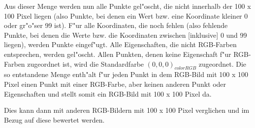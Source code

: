 Aus dieser Menge werden nun alle Punkte gel"oscht, die nicht innerhalb der 100 x 100 Pixel liegen (also Punkte, bei denen ein Wert bzw. eine Koordinate kleiner 0 oder gr"o"ser 99 ist). F"ur alle Koordinaten, die noch fehlen (also fehlende Punkte, bei denen die Werte bzw. die Koordinaten zwischen [inklusive] 0 und 99 liegen), werden Punkte eingef"ugt. Alle Eigenschaften, die nicht RGB-Farben entsprechen, werden gel"oscht. Allen Punkten, denen keine Eigenschaft f"ur RGB- Farben zugeordnet ist, wird die Standardfarbe $(0, 0 ,0 )_{colorRGB}$ zugeordnet. Die so entstandene Menge enth"alt f"ur jeden Punkt in dem RGB-Bild mit 100 x 100 Pixel einen Punkt mit einer RGB-Farbe, aber keinen anderen Punkt oder Eigenschaften und stellt somit ein RGB-Bild mit 100 x 100 Pixel da.

Dies kann dann mit anderen RGB-Bildern mit 100 x 100 Pixel verglichen und im Bezug auf diese bewertet werden.











